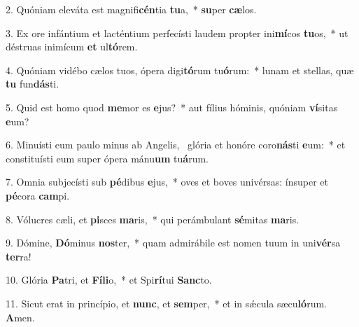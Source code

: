 2. Quóniam eleváta est magnifi\textbf{cén}tia \textbf{tu}a,~*  \textbf{su}per \textbf{cæ}los.\

3. Ex ore infántium et lacténtium perfecísti laudem propter ini\textbf{mí}cos \textbf{tu}os,~*  ut déstruas inimícum \textbf{et} ul\textbf{tó}rem.\

4. Quóniam vidébo cælos tuos, ópera digi\textbf{tó}rum tu\textbf{ó}rum:~*  lunam et stellas, quæ \textbf{tu} fun\textbf{dás}ti.\

5. Quid est homo quod \textbf{me}mor es \textbf{e}jus?~*  aut fílius hóminis, quóniam \textbf{ví}sitas \textbf{e}um?\

6. Minuísti eum paulo minus ab Angelis, \dag\  glória et honóre coro\textbf{nás}ti \textbf{e}um:~*  et constituísti eum super ópera mánu\textbf{um} tu\textbf{á}rum.\

7. Omnia subjecísti sub \textbf{pé}dibus \textbf{e}jus,~*  oves et boves univérsas: ínsuper et \textbf{pé}cora \textbf{cam}pi.\

8. Vólucres cæli, et \textbf{pi}sces \textbf{ma}ris,~*  qui perámbulant \textbf{sé}mitas \textbf{ma}ris.\

9. Dómine, \textbf{Dó}minus \textbf{nos}ter,~*  quam admirábile est nomen tuum in uni\textbf{vér}sa \textbf{ter}ra!\

10. Glória \textbf{Pa}tri, et \textbf{Fí}\textbf{li}o,~*  et Spi\textbf{rí}tui \textbf{Sanc}to.\

11. Sicut erat in princípio, et \textbf{nunc}, et \textbf{sem}per,~*  et in sǽcula sæcu\textbf{ló}rum. \textbf{A}men.\

